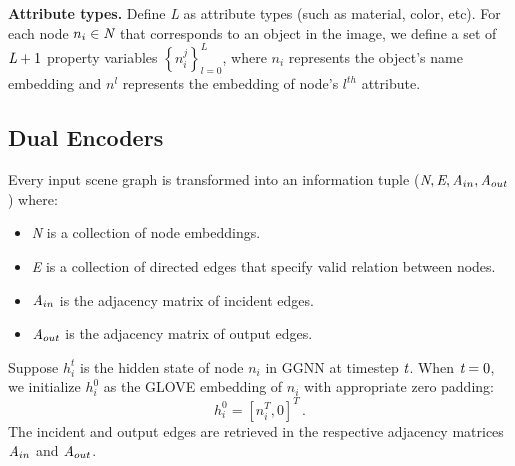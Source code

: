 \documentclass[letterpaper]{article} %
\begin{document}
\medskip
\textbf{Attribute types.} Define \emph{L} as attribute types (such as material, color, etc). 
For each node $n_i\in\emph{N}$ that corresponds to an object in the image, we define a set of $\emph{L}+1$ property variables ${\left\{ n_i^j\right\}}_{l=0}^L$, where $n_i$ represents the object's name embedding and $n^l$ represents the embedding of node's $l^{th}$ attribute.

\subsection{Dual Encoders}

Every input scene graph is transformed into an information tuple ($\emph{N}, \emph{E}, \emph{A}_{in}, \emph{A}_{out}$) where:
\begin{itemize}
    \item \emph{N} is a collection of node embeddings.
    \item \emph{E} is a collection of directed edges that specify valid relation between nodes.
    \item $\emph{A}_{in}$ is the adjacency matrix of incident edges.
    \item $\emph{A}_{out}$ is the adjacency matrix of output edges.
\end{itemize}
Suppose $h_i^t$ is the hidden state of node $n_i$ in GGNN at timestep $\emph{t}$. 
When $\emph{t}=0$, we initialize $h_i^0$ as the GLOVE embedding of $n_i$ with appropriate zero padding:
\begin{equation}
    h_i^0 = [n_i^T, 0]^T  \, .
\end{equation}
The incident and output edges are retrieved in the respective adjacency matrices $\emph{A}_{in}$ and $\emph{A}_{out}$. 
\end{document}
